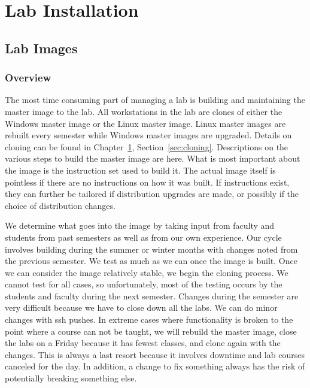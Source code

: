 \chapter{Lab Installation} \label{ch:lab_install}
\section{Lab Images} \label{sec:lab_images}
\subsection{Overview}
The most time consuming part of managing a lab is building and maintaining the master image to the lab.  All workstations in the lab are clones of either the Windows master image or the Linux master image.  Linux master images are rebuilt every semester while Windows master images are upgraded.  Details on cloning can be found in Chapter~\ref{ch:lab_install}, Section~\ref{sec:cloning}.  Descriptions on the various steps to build the master image are here.  What is most important about the image is the instruction set used to build it.  The actual image itself is pointless if there are no instructions on how it was built.  If instructions exist, they can further be tailored if distribution upgrades are made, or possibly if the choice of distribution changes.  

We determine what goes into the image by taking input from faculty and students from past semesters as well as from our own experience.  Our cycle involves building during the summer or winter months with changes noted from the previous semester.  We test as much as we can once the image is built.  Once we can consider the image relatively stable, we begin the cloning process.  We cannot test for all cases, so unfortunately, most of the testing occurs by the students and faculty during the next semester.  Changes during the semester are very difficult because we have to close down all the labs.  We can do minor changes with ssh pushes.  In extreme cases where functionality is broken to the point where a course can not be taught, we will rebuild the master image, close the labs on a Friday because it has fewest classes, and clone again with the changes.  This is always a last resort because it involves downtime and lab courses canceled for the day.  In addition, a change to fix something always has the risk of potentially breaking something else.  

